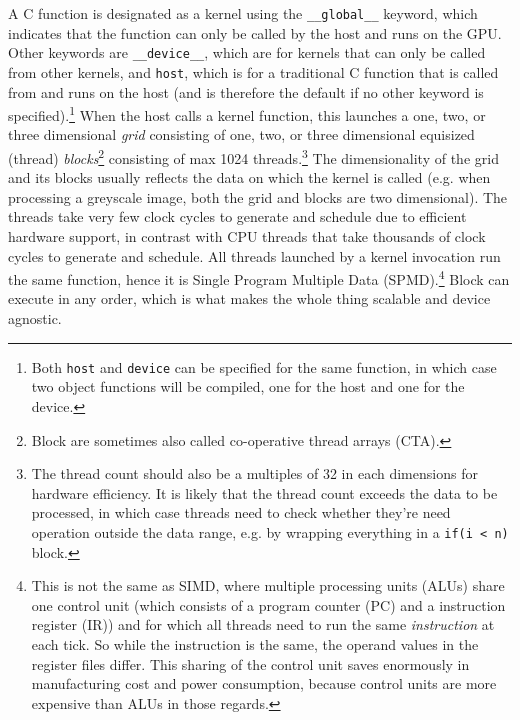 \documentclass[table, xcdraw]{article}%
\begin{document}
A C function is designated as a kernel using the \texttt{__global__} keyword, which indicates that the function can only be called by the host and runs on the GPU. Other keywords are \texttt{__device__}, which are for kernels that can only be called from other kernels, and \texttt{host}, which is for a traditional C function that is called from and runs on the host (and is therefore the default if no other keyword is specified).\footnote{Both \texttt{host} and \texttt{device} can be specified for the same function, in which case two object functions will be compiled, one for the host and one for the device.}
When the host calls a kernel function, this launches a one, two, or three dimensional \emph{grid} consisting of one, two, or three dimensional equisized (thread) \emph{blocks}\footnote{Block are sometimes also called co-operative thread arrays (CTA).} consisting of max 1024 threads.\footnote{The thread count should also be a multiples of 32 in each dimensions for hardware efficiency. It is likely that the thread count exceeds the data to be processed, in which case threads need to check whether they're need operation outside the data range, e.g. by wrapping everything in a \texttt{if(i < n)} block.} The dimensionality of the grid and its blocks usually reflects the data on which the kernel is called (e.g. when processing a greyscale image, both the grid and blocks are two dimensional). The threads take very few clock cycles to generate and schedule due to efficient hardware support, in contrast with CPU threads that take thousands of clock cycles to generate and schedule. All threads launched by a kernel invocation run the same function, hence it is Single Program Multiple Data (SPMD).\footnote{This is not the same as SIMD, where multiple processing units (ALUs) share one control unit (which consists of a program counter (PC) and a instruction register (IR)) and for which all threads need to run the same \textit{instruction} at each tick. So while the instruction is the same, the operand values in the register files differ. This sharing of the control unit saves enormously in manufacturing cost and power consumption, because control units are more expensive than ALUs in those regards.} Block can execute in any order, which is what makes the whole thing scalable and device agnostic.\\
\end{document}
